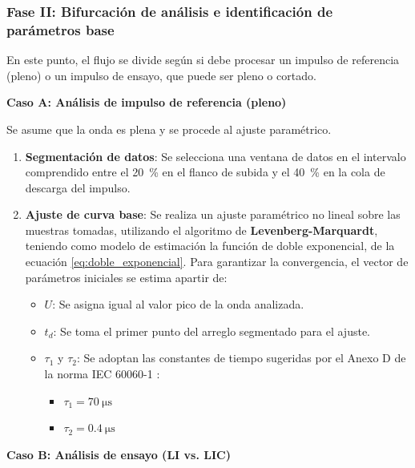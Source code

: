 \subsubsection{Fase II: Bifurcación de análisis e identificación de parámetros base}

En este punto, el flujo se divide según si debe procesar un impulso de referencia (pleno) o un impulso de ensayo, que puede ser pleno o cortado.

\textbf{Caso A: Análisis de impulso de referencia (pleno)}

Se asume que la onda es plena y se procede al ajuste paramétrico.
\begin{enumerate}[resume]
    \item \textbf{Segmentación de datos}: Se selecciona una ventana de datos en el intervalo comprendido entre el \qty{20}{\percent} en el flanco de subida y el \qty{40}{\percent} en la cola de descarga del impulso.
    \item \textbf{Ajuste de curva base}: Se realiza un ajuste paramétrico no lineal sobre las muestras tomadas, utilizando el algoritmo de \textbf{Levenberg-Marquardt}, teniendo como modelo de estimación la función de doble exponencial, de la ecuación \ref{eq:doble_exponencial}.
    Para garantizar la convergencia, el vector de parámetros iniciales se estima apartir de:
    \begin{itemize}
        \item $U$: Se asigna igual al valor pico de la onda analizada.
        \item $t_d$: Se toma el primer punto del arreglo segmentado para el ajuste.
        \item $\tau_1$ y $\tau_2$: Se adoptan las constantes de tiempo sugeridas por el Anexo D de la norma IEC 60060-1 \cite{iec60060_1}:
        \begin{itemize}
            \item $\tau_1 = \qty{70}{\micro\second}$
            \item $\tau_2 = \qty{0.4}{\micro\second}$
        \end{itemize}
    \end{itemize}
\end{enumerate}

\textbf{Caso B: Análisis de ensayo (LI vs. LIC)}

